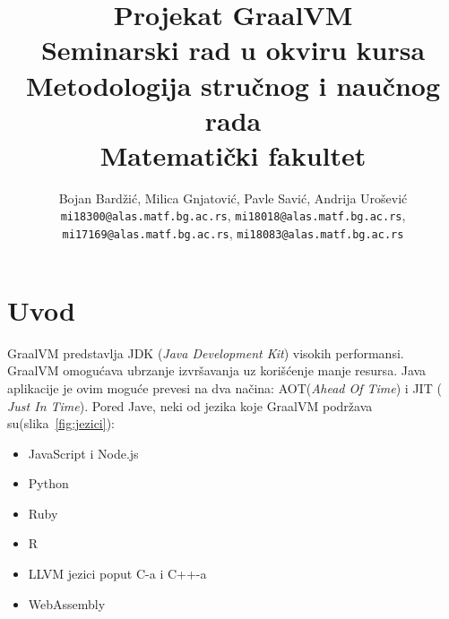 \documentclass[a4paper]{article}
\begin{document}
\title{Projekat GraalVM\\ \small{Seminarski rad u okviru kursa\\Metodologija stručnog i naučnog rada\\ Matematički fakultet}}

\author{Bojan Bardžić, Milica Gnjatović, Pavle Savić, Andrija Urošević\\ 
	\texttt{mi18300@alas.matf.bg.ac.rs}, 
	\texttt{mi18018@alas.matf.bg.ac.rs}, \\ 
	\texttt{mi17169@alas.matf.bg.ac.rs}, 
	\texttt{mi18083@alas.matf.bg.ac.rs}}


\maketitle


\tableofcontents

\newpage

\section{Uvod}
\label{sec:uvod}
GraalVM predstavlja JDK (\emph{Java Development Kit}) visokih performansi\cite{graalvmintroduction}. GraalVM omogućava ubrzanje izvršavanja uz korišćenje manje resursa. Java aplikacije je ovim moguće prevesi na dva načina: AOT(\emph{Ahead Of Time}) i JIT ( \emph{Just In Time}). Pored Jave, neki od jezika koje GraalVM podržava su(slika~\ref{fig:jezici}): 
\begin{itemize}
	\item JavaScript i Node.js
	\item Python
	\item Ruby
	\item R
	\item LLVM jezici poput C-a i C++-a
	\item WebAssembly\\
\end{itemize}
\end{document}
